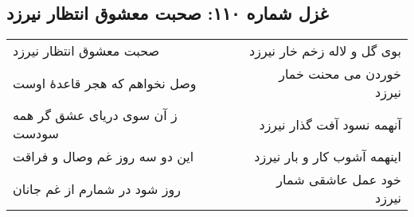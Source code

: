\begin{center}
\section*{غزل شماره ۱۱۰: صحبت معشوق انتظار نیرزد}
\label{sec:110}
\begin{longtable}{l p{0.5cm} r}
صحبت معشوق انتظار نیرزد
&&
بوی گل و لاله زخم خار نیرزد
\\
وصل نخواهم که هجر قاعدهٔ اوست
&&
خوردن می محنت خمار نیرزد
\\
ز آن سوی دریای عشق گر همه سودست
&&
آنهمه نسود آفت گذار نیرزد
\\
این دو سه روز غم وصال و فراقت
&&
اینهمه آشوب کار و بار نیرزد
\\
روز شود در شمارم از غم جانان
&&
خود عمل عاشقی شمار نیرزد
\\
\end{longtable}
\end{center}
